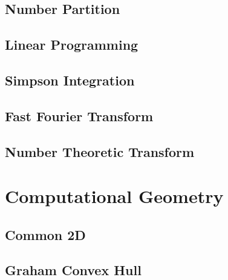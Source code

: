 \documentclass[10pt]{article}
\begin{document}
\subsection{Number Partition} {

\subsection{Linear Programming}

\subsection{Simpson Integration}

\subsection{Fast Fourier Transform}

\subsection{Number Theoretic Transform}


\section{Computational Geometry}
\subsection{Common 2D}

\subsection{Graham Convex Hull}

}
\end{document}
